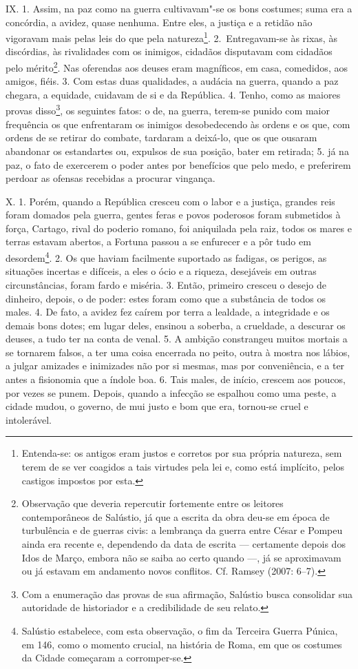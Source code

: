 IX. 1. Assim, na paz como na guerra cultivavam"-se os bons costumes; suma era a
concórdia, a avidez, quase nenhuma. Entre eles, a justiça e a retidão não
vigoravam mais pelas leis do que pela natureza\footnote{Entenda-se: os antigos
eram justos e corretos por sua própria natureza, sem terem de se ver coagidos a
tais virtudes pela lei e, como está implícito, pelos castigos impostos por
esta.}. 2.~Entregavam-se às rixas, às discórdias, às rivalidades com os
inimigos, cidadãos disputavam com cidadãos pelo mérito\footnote{Observação que
deveria repercutir fortemente entre os leitores contemporâneos de Salústio, já
que a escrita da obra deu-se em época de turbulência e de guerras civis: a
lembrança da guerra entre César e Pompeu ainda era recente e, dependendo da
data de escrita --- certamente depois dos Idos de Março, embora não se saiba ao
certo quando ---, já se aproximavam ou já estavam
em andamento novos conflitos. Cf. Ramsey (2007: 6--7).}. Nas oferendas aos deuses eram magníficos, em
casa, comedidos, aos amigos, fiéis. 3. Com estas duas qualidades, a audácia na
guerra, quando a paz chegara, a equidade, cuidavam de si e da República. 4. Tenho,
como as maiores provas disso\footnote{Com a enumeração das provas de sua
afirmação, Salústio busca consolidar sua autoridade de historiador e a
credibilidade de seu relato.}, os seguintes fatos: o de, na guerra, terem-se
punido com maior frequência os que enfrentaram os inimigos desobedecendo às
ordens e os que, com ordens de se retirar do combate, tardaram a deixá-lo, que
os que ousaram abandonar os estandartes ou, expulsos de sua posição, bater em
retirada; 5. já na paz, o fato de exercerem o poder antes por benefícios que
pelo medo, e preferirem perdoar as ofensas recebidas a procurar vingança. 

X. 1. Porém, quando a República cresceu com o labor e a justiça, grandes reis
foram domados pela guerra, gentes feras e povos poderosos foram submetidos à
força, %
Cartago, rival do poderio romano, foi aniquilada pela raiz, todos os
mares e terras estavam abertos, a Fortuna passou a se enfurecer e a pôr tudo em
desordem\footnote{Salústio estabelece, com esta observação, o fim da Terceira
Guerra Púnica, em 146, como o momento crucial, na história de Roma, em que os
costumes da Cidade começaram a corromper-se.}. 2. Os que haviam facilmente
suportado as fadigas, os perigos, as situações incertas e difíceis, a eles o
ócio e a riqueza, desejáveis em outras circunstâncias, foram fardo e miséria.
3. Então, primeiro cresceu o desejo de dinheiro, depois, o de poder: estes
foram como que a substância de todos os males. 4. De fato, a avidez fez caírem
por terra a lealdade, a integridade e os demais bons dotes; em lugar deles,
ensinou a soberba, a crueldade, a descurar os deuses, a tudo ter na conta de
venal. 5. A ambição constrangeu muitos mortais a se tornarem falsos, a ter uma
coisa encerrada no peito, outra à mostra nos lábios, a julgar amizades e
inimizades não por si mesmas, mas por conveniência, e a ter antes a fisionomia
que a índole boa. 6. Tais males, de início, crescem aos poucos, por vezes se
punem. Depois, quando a infecção se espalhou como uma peste, a cidade mudou, o
governo, de mui justo e bom que era, tornou-se cruel e intolerável.

